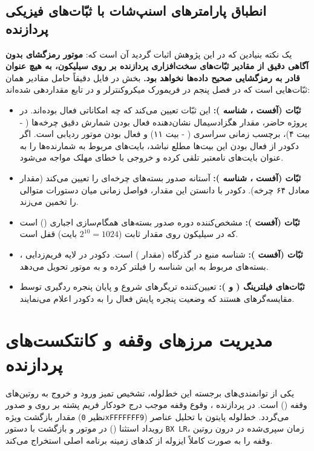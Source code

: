 \subsection{انطباق پارامترهای اسنپ‌شات با ثبّات‌های فیزیکی پردازنده}
یک نکته بنیادین که در این پژوهش اثبات گردید آن است که: \textbf{موتور رمزگشای  بدون آگاهی دقیق از مقادیر ثبّات‌های سخت‌افزاری پردازنده بر روی سیلیکون، به هیچ عنوان قادر به رمزگشایی صحیح داده‌ها نخواهد بود.} بخش \lr{\texttt{[regs]}} در فایل  دقیقاً حامل مقادیر همان ثبّات‌هایی است که در فصل پنجم در فریمورک میکروکنترلر و در تابع  مقداردهی شده‌اند:
\begin{itemize}
    \item \textbf{ثبّات  (آفست ، شناسه ):} این ثبّات تعیین می‌کند که چه امکاناتی فعال بوده‌اند. در پروژه حاضر، مقدار هگزادسیمال  نشان‌دهنده فعال بودن شمارش دقیق چرخه‌ها ( - بیت ۴)، برچسب زمانی سراسری ( - بیت ۱۱) و فعال بودن موتور ردیابی است. اگر دکودر از فعال بودن این بیت‌ها مطلع نباشد، بایت‌های مربوط به شمارنده‌ها را به عنوان بایت‌های نامعتبر تلقی کرده و خروجی با خطای مهلک مواجه می‌شود.
    \item \textbf{ثبّات  (آفست ، شناسه ):} آستانه صدور بسته‌های چرخه‌ای را تعیین می‌کند (مقدار  معادل ۶۴ چرخه). دکودر با دانستن این مقدار، فواصل زمانی میان دستورات متوالی را تخمین می‌زند.
    \item \textbf{ثبّات  (آفست ):} مشخص‌کننده دوره صدور بسته‌های همگام‌سازی اجباری () است که در سیلیکون  روی مقدار ثابت  ($2^{10} = 1024$ بایت) قفل است.
    \item \textbf{ثبّات  (آفست ):} شناسه منبع در گذرگاه  (مقدار ) است. دکودر در لایه فریم‌زدایی ، بسته‌های مربوط به این شناسه را فیلتر کرده و به موتور  تحویل می‌دهد.
    \item \textbf{ثبّات‌های فیلترینگ ( و ):} تعیین‌کننده تریگرهای شروع و پایان پنجره ردگیری توسط مقایسه‌گرهای  هستند که وضعیت پنجره پایش فعال را به دکودر اعلام می‌نمایند.
\end{itemize}

\section{مدیریت مرزهای وقفه و کانتکست‌های پردازنده}
\label{sec:isr_and_context_management}
یکی از توانمندی‌های برجسته این خط‌لوله، تشخیص تمیز ورود و خروج به روتین‌های وقفه () است. در پردازنده ، وقوع وقفه موجب درج خودکار فریم پشته بر روی  و صدور مقدار بازگشت ویژه  (نظیر \texttt{0xFFFFFFF9}) می‌گردد. خط‌لوله پایتون با تحلیل عناصر رویداد استثنا () در موتور  و بازگشت با دستور \texttt{BX LR}، زمان سپری‌شده در درون روتین وقفه را به صورت کاملاً ایزوله از کدهای زمینه برنامه اصلی استخراج می‌کند.


